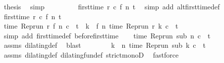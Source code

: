 \begin{isabellebody}
\ {\isacharquery}thesis\ \isamarkupfalse%
\ simp\isanewline
\ \ \isamarkupfalse%
\isanewline
\ \ \isamarkupfalse%
\ {\isacharasterisk}{\isacharasterisk}\ \isamarkupfalse%
\ {\isacartoucheopen}first{\isacharunderscore}time\ r\ c\ {\isacharparenleft}f\ n{\isacharparenright}\ t{\isacartoucheclose}\ \isamarkupfalse%
\ {\isacharparenleft}simp\ add{\isacharcolon}\ alt{\isacharunderscore}first{\isacharunderscore}time{\isacharunderscore}def{\isacharparenright}\isanewline
{}\isamarkupfalse%
\isanewline
\ \ \isamarkupfalse%
\ {\isacartoucheopen}first{\isacharunderscore}time\ r\ c\ {\isacharparenleft}f\ n{\isacharparenright}\ t{\isacartoucheclose}\isanewline
\ \ \isamarkupfalse%
\ {\isacharasterisk}{\isacharcolon}{\isacartoucheopen}time\ {\isacharparenleft}{\isacharparenleft}Rep{\isacharunderscore}run\ r{\isacharparenright}\ {\isacharparenleft}f\ n{\isacharparenright}\ c{\isacharparenright}\ {\isacharequal}\ t\ {\isasymand}\ {\isacharparenleft}{\isasymforall}k\ {\isacharless}\ f\ n{\isachardot}\ time\ {\isacharparenleft}{\isacharparenleft}Rep{\isacharunderscore}run\ r{\isacharparenright}\ k\ c{\isacharparenright}\ {\isacharless}\ t{\isacharparenright}{\isacartoucheclose}\isanewline
\ \ \ \ \isamarkupfalse%
\ {\isacharparenleft}simp\ add{\isacharcolon}\ first{\isacharunderscore}time{\isacharunderscore}def\ before{\isacharunderscore}first{\isacharunderscore}time{\isacharparenright}\isanewline
\ \ \isamarkupfalse%
\ {\isacartoucheopen}time\ {\isacharparenleft}{\isacharparenleft}Rep{\isacharunderscore}run\ sub{\isacharparenright}\ n\ c{\isacharparenright}\ {\isacharequal}\ t{\isacartoucheclose}\ \isamarkupfalse%
\ assms\ dilating{\isacharunderscore}def\ \isamarkupfalse%
\ blast\isanewline
\ \ \isamarkupfalse%
\ \isamarkupfalse%
\ {\isacharasterisk}\ \isamarkupfalse%
\ {\isacartoucheopen}{\isacharparenleft}{\isasymforall}k\ {\isacharless}\ n{\isachardot}\ time\ {\isacharparenleft}{\isacharparenleft}Rep{\isacharunderscore}run\ sub{\isacharparenright}\ k\ c{\isacharparenright}\ {\isacharless}\ t{\isacharparenright}{\isacartoucheclose}\isanewline
\ \ \ \ \isamarkupfalse%
\ assms\ dilating{\isacharunderscore}def\ dilating{\isacharunderscore}fun{\isacharunderscore}def\ strict{\isacharunderscore}monoD\ \isamarkupfalse%
\ fastforce\isanewline
\ \ \isamarkupfalse%
\ \isamarkupfalse%

\end{isabellebody}
